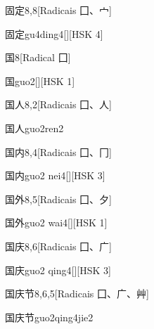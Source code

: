\begin{entry}{固定}{8,8}[Radicais ⼞、⼧]
  \begin{phonetics}{固定}{gu4ding4}[][HSK 4]
  \end{phonetics}
\end{entry}

\begin{entry}{国}{8}[Radical ⼞]
  \begin{phonetics}{国}{guo2}[][HSK 1]
  \end{phonetics}
\end{entry}

\begin{entry}{国人}{8,2}[Radicais ⼞、⼈]
  \begin{phonetics}{国人}{guo2ren2}
  \end{phonetics}
\end{entry}

\begin{entry}{国内}{8,4}[Radicais ⼞、⼌]
  \begin{phonetics}{国内}{guo2 nei4}[][HSK 3]
  \end{phonetics}
\end{entry}

\begin{entry}{国外}{8,5}[Radicais ⼞、⼣]
  \begin{phonetics}{国外}{guo2 wai4}[][HSK 1]
  \end{phonetics}
\end{entry}

\begin{entry}{国庆}{8,6}[Radicais ⼞、⼴]
  \begin{phonetics}{国庆}{guo2 qing4}[][HSK 3]
  \end{phonetics}
\end{entry}

\begin{entry}{国庆节}{8,6,5}[Radicais ⼞、⼴、⾋]
  \begin{phonetics}{国庆节}{guo2qing4jie2}
  \end{phonetics}
\end{entry}

